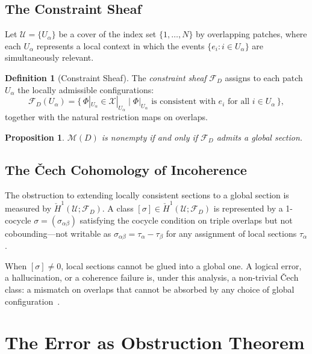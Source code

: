 \documentclass[12pt,oneside]{article}
\theoremstyle{plain}
\newtheorem{proposition}[theorem]{Proposition}
\theoremstyle{definition}
\newtheorem{definition}[theorem]{Definition}
\theoremstyle{remark}
\newcommand{\X}{\mathcal{X}}
\newcommand{\M}{\mathcal{M}}
\newcommand{\Sh}{\mathcal{F}}
\newcommand{\D}{D}
\newcommand{\Hcheck}{\check{H}}
\begin{document}
\subsection{The Constraint Sheaf}

Let $\mathcal{U} = \{U_\alpha\}$ be a cover of the index set $\{1,\dotsc,N\}$
by overlapping patches, where each $U_\alpha$ represents a local context in
which the events $\{e_i : i \in U_\alpha\}$ are simultaneously relevant.

\begin{definition}[Constraint Sheaf]
The \emph{constraint sheaf} $\Sh_\D$ assigns to each patch $U_\alpha$ the
locally admissible configurations:
\[
  \Sh_\D(U_\alpha)
  = \bigl\{\,\Phi|_{U_\alpha} \in \X|_{U_\alpha} \;\big|\;
  \Phi|_{U_\alpha}\text{ is consistent with }e_i
  \text{ for all }i \in U_\alpha\,\bigr\},
\]
together with the natural restriction maps on overlaps.
\end{definition}

\begin{proposition}
\label{prop:section}
$\M(\D)$ is nonempty if and only if $\Sh_\D$ admits a global section.
\end{proposition}

\subsection{The \v{C}ech Cohomology of Incoherence}

The obstruction to extending locally consistent sections to a global section is
measured by $\Hcheck^1(\mathcal{U};\Sh_\D)$. A class
$[\sigma] \in \Hcheck^1(\mathcal{U};\Sh_\D)$ is represented by a 1-cocycle
$\sigma = (\sigma_{\alpha\beta})$ satisfying the cocycle condition on triple
overlaps but not cobounding---not writable as $\sigma_{\alpha\beta} =
\tau_\alpha - \tau_\beta$ for any assignment of local sections $\tau_\alpha$.

When $[\sigma] \neq 0$, local sections cannot be glued into a global one. A
logical error, a hallucination, or a coherence failure is, under this analysis, a
non-trivial \v{C}ech class: a mismatch on overlaps that cannot be absorbed by
any choice of global configuration~\cite{BottTu1982,GelfandManin1996,AbramskyBrandenburger2011,Ghrist2014}.

\section{The Error as Obstruction Theorem}
\label{sec:obstruction}
\end{document}
